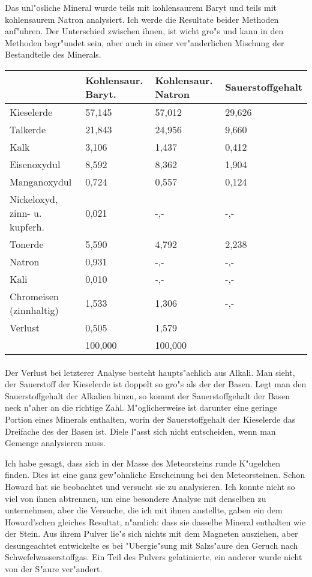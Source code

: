 \documentclass[a4paper, 11pt, oneside]{article}
\begin{document}
Das unl"osliche Mineral wurde teils mit kohlensaurem Baryt und teils mit kohlensaurem Natron analysiert. Ich werde die Resultate beider Methoden anf"uhren. Der Unterschied zwischen ihnen, ist wicht gro"s und kann in den Methoden begr"undet sein, aber auch in einer ver"anderlichen Mischung der Bestandteile des Minerals.
\begin{center}
\begin{tabular}{ |p{29mm}|p{21mm}|p{21mm}|p{30mm}| }
    \hline
      & Kohlensaur. Baryt. & Kohlensaur. Natron & Sauerstoffgehalt\\\hline
    Kieselerde & 57,145 & 57,012 & 29,626\\\hline
    Talkerde & 21,843 & 24,956 & 9,660\\\hline
    Kalk & 3,106 & 1,437 & 0,412\\\hline
    Eisenoxydul & 8,592 & 8,362 & 1,904\\\hline
    Manganoxydul & 0,724 & 0,557  & 0,124\\\hline
    Nickeloxyd, zinn- u. kupferh. & 0,021  & -,-  & -,-\\\hline
    Tonerde & 5,590 & 4,792 & 2,238\\\hline
    Natron & 0,931 & -,- & -,-\\\hline
    Kali & 0,010 & -,-  & -,-\\\hline
    Chromeisen (zinnhaltig) & 1,533 & 1,306 & -,-\\\hline
    Verlust & 0,505 & 1,579 & \\\hline
     & 100,000 & 100,000 & \\
    \hline
\end{tabular}
\end{center}
\paragraph{}
Der Verlust bei letzterer Analyse besteht haupts"achlich aus Alkali. Man sieht, der Sauerstoff der Kieselerde ist doppelt so gro"s als der der Basen. Legt man den Sauerstoffgehalt der Alkalien hinzu, so kommt der Sauerstoffgehalt der Basen neck n"aher an die richtige Zahl. M"oglicherweise ist darunter eine geringe Portion eines Minerals enthalten, worin der Sauerstoffgehalt der Kieselerde das Dreifache des der Basen ist. Diele l"asst sich nicht entscheiden, wenn man Gemenge analysieren muss.

Ich habe gesagt, dass sich in der Masse des Meteorsteins runde K"ugelchen finden. Dies ist eine ganz gew"ohnliche Erscheinung bei den Meteorsteinen. Schon Howard hat sie beobachtet und versucht sie zu analysieren. Ich konnte nicht so viel von ihnen abtrennen, um eine besondere Analyse mit denselben zu unternehmen, aber die Versuche, die ich mit ihnen anstellte, gaben ein dem Howard'schen gleiches Resultat, n"amlich: dass sie dasselbe Mineral enthalten wie der Stein. Aus ihrem Pulver lie"s sich nichts mit dem Magneten ausziehen, aber desungeachtet entwickelte es bei "Ubergie"sung mit Salzs"aure den Geruch nach Schwefelwasserstoffgas. Ein Teil des Pulvers gelatinierte, ein anderer wurde nicht von der S"aure ver"andert.
\end{document}
